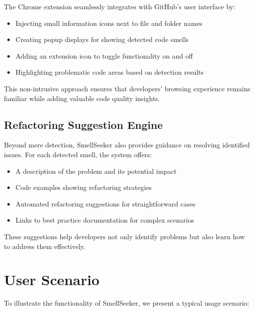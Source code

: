 \documentclass[sigconf,screen]{acmart}
\begin{document}
The Chrome extension seamlessly integrates with GitHub's user interface by:

\begin{itemize}
    \item Injecting small information icons next to file and folder names
    \item Creating popup displays for showing detected code smells
    \item Adding an extension icon to toggle functionality on and off
    \item Highlighting problematic code areas based on detection results
\end{itemize}

This non-intrusive approach ensures that developers' browsing experience remains familiar while adding valuable code quality insights.

\subsection{Refactoring Suggestion Engine}

Beyond mere detection, SmellSeeker also provides guidance on resolving identified issues. For each detected smell, the system offers:

\begin{itemize}
    \item A description of the problem and its potential impact
    \item Code examples showing refactoring strategies
    \item Automated refactoring suggestions for straightforward cases
    \item Links to best practice documentation for complex scenarios
\end{itemize}

These suggestions help developers not only identify problems but also learn how to address them effectively.

\section{User Scenario}

To illustrate the functionality of SmellSeeker, we present a typical usage scenario:
\end{document}
